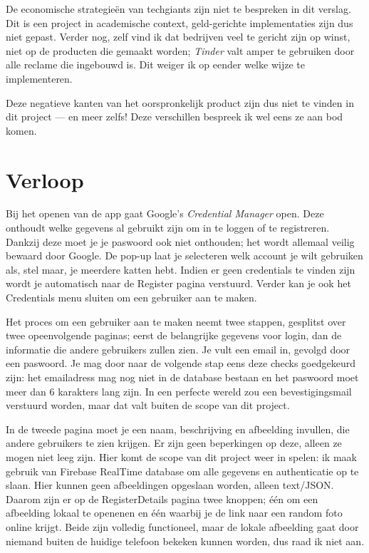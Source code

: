 \documentclass{report}
\begin{document}
De economische strategieën van techgiants zijn niet te bespreken in dit verslag. Dit is een project in academische context, geld-gerichte implementaties zijn dus niet gepast.
Verder nog, zelf vind ik dat bedrijven veel te gericht zijn op winst, niet op de producten die gemaakt worden; \textit{Tinder} valt amper te gebruiken door alle reclame die ingebouwd is. Dit weiger ik op eender welke wijze te implementeren.

Deze negatieve kanten van het oorspronkelijk product zijn dus niet te vinden in dit project --- en meer zelfs! Deze verschillen bespreek ik wel eens ze aan bod komen.


\chapter{Verloop}

Bij het openen van de app gaat Google's \textit{Credential Manager} open. Deze onthoudt welke gegevens al gebruikt zijn om in te loggen of te registreren.
Dankzij deze moet je je paswoord ook niet onthouden; het wordt allemaal veilig bewaard door Google.
De pop-up laat je selecteren welk account je wilt gebruiken als, stel maar, je meerdere katten hebt. Indien er geen credentials te vinden zijn wordt je automatisch naar de Register pagina verstuurd.
Verder kan je ook het Credentials menu sluiten om een gebruiker aan te maken.

Het proces om een gebruiker aan te maken neemt twee stappen, gesplitst over twee opeenvolgende paginas; eerst de belangrijke gegevens voor login, dan de informatie die andere gebruikers zullen zien.
Je vult een email in, gevolgd door een paswoord. Je mag door naar de volgende stap eens deze checks goedgekeurd zijn: het emailadress mag nog niet in de database bestaan en het paswoord moet meer dan 6 karakters lang zijn.
In een perfecte wereld zou een bevestigingsmail verstuurd worden, maar dat valt buiten de scope van dit project.

In de tweede pagina moet je een naam, beschrijving en afbeelding invullen, die andere gebruikers te zien krijgen. Er zijn geen beperkingen op deze, alleen ze mogen niet leeg zijn.
Hier komt de scope van dit project weer in spelen: ik maak gebruik van Firebase RealTime database om alle gegevens en authenticatie op te slaan. Hier kunnen geen afbeeldingen opgeslaan worden, alleen text/JSON.
Daarom zijn er op de RegisterDetails pagina twee knoppen; één om een afbeelding lokaal te openenen en één waarbij je de link naar een random foto online krijgt. 
Beide zijn volledig functioneel, maar de lokale afbeelding gaat door niemand buiten de huidige telefoon bekeken kunnen worden, dus raad ik niet aan.
\end{document}
